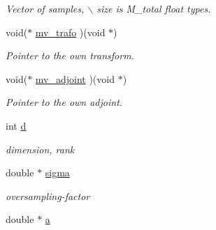 \begin{CompactItemize}
\begin{CompactList}\small\item\em Vector of samples, $\backslash$ size is M\_\-total float types. \item\end{CompactList}\item 
\hypertarget{structnnfft__plan_c2beab555e72c8f10921db21dc094069}{
void($\ast$ \hyperlink{structnnfft__plan_c2beab555e72c8f10921db21dc094069}{mv\_\-trafo} )(void $\ast$)}
\label{structnnfft__plan_c2beab555e72c8f10921db21dc094069}

\begin{CompactList}\small\item\em Pointer to the own transform. \item\end{CompactList}\item 
\hypertarget{structnnfft__plan_0afd6961b8b0b24b526e034d89874c7c}{
void($\ast$ \hyperlink{structnnfft__plan_0afd6961b8b0b24b526e034d89874c7c}{mv\_\-adjoint} )(void $\ast$)}
\label{structnnfft__plan_0afd6961b8b0b24b526e034d89874c7c}

\begin{CompactList}\small\item\em Pointer to the own adjoint. \item\end{CompactList}\item 
\hypertarget{structnnfft__plan_97241bcd9654d3e90a556806e7998ab6}{
int \hyperlink{structnnfft__plan_97241bcd9654d3e90a556806e7998ab6}{d}}
\label{structnnfft__plan_97241bcd9654d3e90a556806e7998ab6}

\begin{CompactList}\small\item\em dimension, rank \item\end{CompactList}\item 
\hypertarget{structnnfft__plan_6a3e11978f1e2c6279bd12785ef56b5d}{
double $\ast$ \hyperlink{structnnfft__plan_6a3e11978f1e2c6279bd12785ef56b5d}{sigma}}
\label{structnnfft__plan_6a3e11978f1e2c6279bd12785ef56b5d}

\begin{CompactList}\small\item\em oversampling-factor \item\end{CompactList}\item 
\hypertarget{structnnfft__plan_0a30183077239e2de76e5de626dc92e9}{
double $\ast$ \hyperlink{structnnfft__plan_0a30183077239e2de76e5de626dc92e9}{a}}
\label{structnnfft__plan_0a30183077239e2de76e5de626dc92e9}


\end{CompactItemize}
